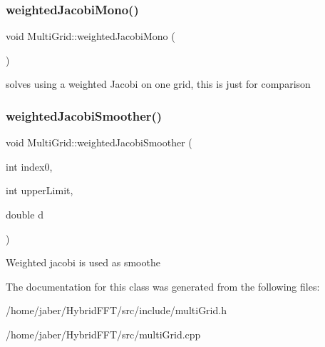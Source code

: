 \subsubsection{\texorpdfstring{weighted\+Jacobi\+Mono()}{weightedJacobiMono()}}
{\footnotesize\ttfamily void Multi\+Grid\+::weighted\+Jacobi\+Mono (\begin{DoxyParamCaption}{ }\end{DoxyParamCaption})}

solves using a weighted Jacobi on one grid, this is just for comparison \mbox{\label{classMultiGrid_a7a81c22ab36afae5dc0b926423b6a91f}} 
\subsubsection{\texorpdfstring{weighted\+Jacobi\+Smoother()}{weightedJacobiSmoother()}}
{\footnotesize\ttfamily void Multi\+Grid\+::weighted\+Jacobi\+Smoother (\begin{DoxyParamCaption}\item[{int}]{index0,  }\item[{int}]{upper\+Limit,  }\item[{double}]{d }\end{DoxyParamCaption})}

Weighted jacobi is used as smoothe 

The documentation for this class was generated from the following files\+:\begin{DoxyCompactItemize}
\item 
/home/jaber/\+Hybrid\+F\+F\+T/src/include/multi\+Grid.\+h\item 
/home/jaber/\+Hybrid\+F\+F\+T/src/multi\+Grid.\+cpp\end{DoxyCompactItemize}
